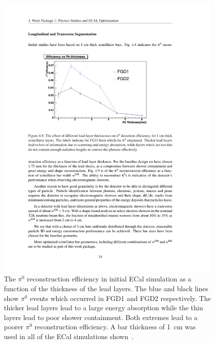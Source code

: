 \begin{figure}[t!]
  \centering
  \includegraphics[width=14cm]{images/t2k/ECal_LeadThickness_pi0RecoEfficiency.pdf}
  \caption{The $\pi^0$ reconstruction efficiency in initial ECal simulation as a function of the thickness of the lead layers.  The blue and black lines show $\pi^0$ events which occurred in FGD1 and FGD2 respectively.  The thicker lead layers lead to a large energy absorption while the thin layers lead to poor shower containment.  Both extremes lead to a poorer $\pi^0$ reconstruction efficiency.  A bar thickness of 1~cm was used in all of the ECal simulations shown~\cite{T2KUKProposal}.}
  \label{fig:ECalPi0RecoEffVsLeadThickness}
\end{figure}
\newline
\newline
